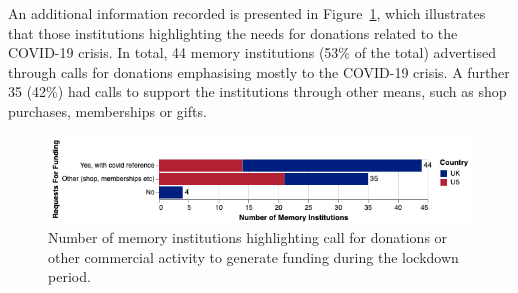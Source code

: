 \documentclass{egpubl}
\begin{document}
An additional information recorded is presented in Figure~\ref{fig:funding}, which illustrates that those institutions highlighting the needs for donations related to the COVID-19 crisis. In total, 44 memory institutions (53\% of the total) advertised through calls for donations emphasising mostly to the COVID-19 crisis. A further 35 (42\%) had calls to support the institutions through other means, such as shop purchases, memberships or gifts.

\begin{figure}[h]
  \centering
  \includegraphics[width=\linewidth]{images/funding.png}
  \caption{\label{fig:funding}
            Number of memory institutions highlighting call for donations or other commercial activity to generate funding during the lockdown period.}
\end{figure}














\end{document}
